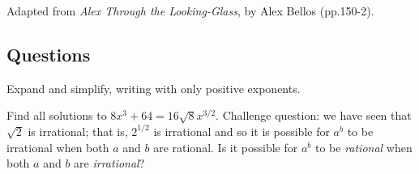 \begin{flushright}
  Adapted from \textit{Alex Through the Looking-Glass}, by Alex Bellos (pp.150-2).
\end{flushright}

\clearpage
\subsection*{Questions}
\begin{questions}
  \question Expand and simplify, writing with only positive exponents.
  \question Find all solutions to $ 8x^{3} + 64 = 16\sqrt{8}x^{3/2} $.
  \question Challenge question: we have seen that $ \sqrt{2} $ is irrational; that is, $ 2^{1/2} $ is irrational
            and so it is possible for $ a^b $ to be irrational when both $ a $ and $ b $ are
            rational. Is it possible for $ a^b $ to be \emph{rational} when both $ a $ and $ b $
            are \emph{irrational}?
\end{questions}


